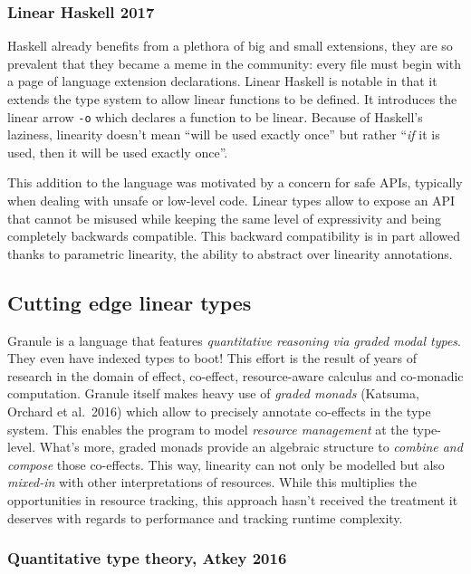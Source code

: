 \documentclass[
]{article}
\begin{document}
\hypertarget{linear-haskell-2017}{%
\subsubsection{Linear Haskell 2017}\label{linear-haskell-2017}}

Haskell already benefits from a plethora of big and small extensions,
they are so prevalent that they became a meme in the community: every
file must begin with a page of language extension declarations. Linear
Haskell is notable in that it extends the type system to allow linear
functions to be defined. It introduces the linear arrow \texttt{-o}
which declares a function to be linear. Because of Haskell's laziness,
linearity doesn't mean ``will be used exactly once'' but rather
``\emph{if} it is used, then it will be used exactly once''.

This addition to the language was motivated by a concern for safe APIs,
typically when dealing with unsafe or low-level code. Linear types allow
to expose an API that cannot be misused while keeping the same level of
expressivity and being completely backwards compatible. This backward
compatibility is in part allowed thanks to parametric linearity, the
ability to abstract over linearity annotations.

\hypertarget{cutting-edge-linear-types}{%
\subsection{Cutting edge linear types}\label{cutting-edge-linear-types}}

Granule is a language that features \emph{quantitative reasoning via
graded modal types}. They even have indexed types to boot! This effort
is the result of years of research in the domain of effect, co-effect,
resource-aware calculus and co-monadic computation. Granule itself makes
heavy use of \emph{graded monads} (Katsuma, Orchard et al.~2016) which
allow to precisely annotate co-effects in the type system. This enables
the program to model \emph{resource management} at the type-level.
What's more, graded monads provide an algebraic structure to
\emph{combine and compose} those co-effects. This way, linearity can not
only be modelled but also \emph{mixed-in} with other interpretations of
resources. While this multiplies the opportunities in resource tracking,
this approach hasn't received the treatment it deserves with regards to
performance and tracking runtime complexity.

\hypertarget{quantitative-type-theory-atkey-2016}{%
\subsubsection{Quantitative type theory, Atkey
2016}\label{quantitative-type-theory-atkey-2016}}
\end{document}
